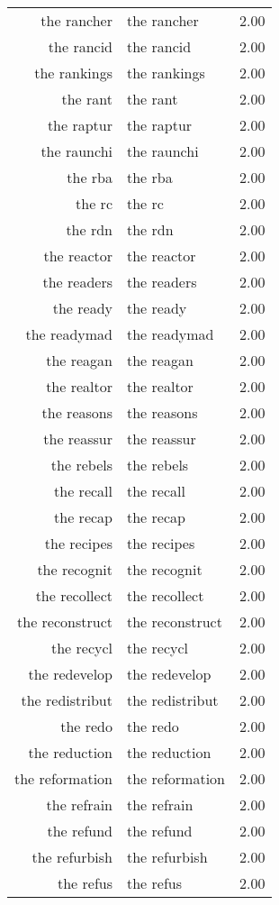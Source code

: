 \begin{table}[ht]
\begin{tabular}{rlr}
  the rancher & the rancher & 2.00 \\ 
  the rancid & the rancid & 2.00 \\ 
  the rankings & the rankings & 2.00 \\ 
  the rant & the rant & 2.00 \\ 
  the raptur & the raptur & 2.00 \\ 
  the raunchi & the raunchi & 2.00 \\ 
  the rba & the rba & 2.00 \\ 
  the rc & the rc & 2.00 \\ 
  the rdn & the rdn & 2.00 \\ 
  the reactor & the reactor & 2.00 \\ 
  the readers & the readers & 2.00 \\ 
  the ready & the ready & 2.00 \\ 
  the readymad & the readymad & 2.00 \\ 
  the reagan & the reagan & 2.00 \\ 
  the realtor & the realtor & 2.00 \\ 
  the reasons & the reasons & 2.00 \\ 
  the reassur & the reassur & 2.00 \\ 
  the rebels & the rebels & 2.00 \\ 
  the recall & the recall & 2.00 \\ 
  the recap & the recap & 2.00 \\ 
  the recipes & the recipes & 2.00 \\ 
  the recognit & the recognit & 2.00 \\ 
  the recollect & the recollect & 2.00 \\ 
  the reconstruct & the reconstruct & 2.00 \\ 
  the recycl & the recycl & 2.00 \\ 
  the redevelop & the redevelop & 2.00 \\ 
  the redistribut & the redistribut & 2.00 \\ 
  the redo & the redo & 2.00 \\ 
  the reduction & the reduction & 2.00 \\ 
  the reformation & the reformation & 2.00 \\ 
  the refrain & the refrain & 2.00 \\ 
  the refund & the refund & 2.00 \\ 
  the refurbish & the refurbish & 2.00 \\ 
  the refus & the refus & 2.00 \\ 

\end{tabular}
\end{table}
